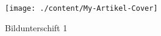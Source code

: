 \begin{refsection}
\begin{figure}[t]
  \begin{center}
  \texttt{[image: ./content/My-Artikel-Cover]}
  \caption{Bildunterschift 1}\label{fig:label1}		%
  \end{center}
\end{figure}

% 
\printbibliography
\end{refsection}

